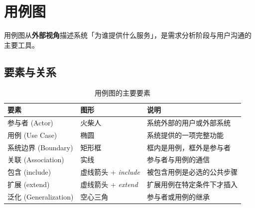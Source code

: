 \section{用例图}

用例图从\textbf{外部视角}描述系统「为谁提供什么服务」，是需求分析阶段与用户沟通的主要工具。

\subsection{要素与关系}

\begin{table}[H]
\centering
\caption{用例图的主要要素}
\begin{tabulary}{\textwidth}{LLL}
\toprule
要素 & 图形 & 说明 \\
\midrule
参与者 (Actor) & 火柴人 & 系统外部的用户或外部系统 \\
用例 (Use Case) & 椭圆 & 系统提供的一项完整功能 \\
系统边界 (Boundary) & 矩形框 & 框内是用例，框外是参与者 \\
关联 (Association) & 实线 & 参与者与用例的通信 \\
包含 (include) & 虚线箭头 + \textit{include} & 被包含用例是必选的公共步骤 \\
扩展 (extend) & 虚线箭头 + \textit{extend} & 扩展用例在特定条件下才插入 \\
泛化 (Generalization) & 空心三角 & 参与者或用例的继承 \\
\bottomrule
\end{tabulary}
\end{table}

\newcommand{\umlactor}[2]{%
    \coordinate (#1) at #2;
    \draw[thick] (#1) ++(0,0.34) circle (0.11);
    \draw[thick] (#1) ++(0,0.23) -- ++(0,-0.35);
    \draw[thick] (#1) ++(-0.16,0.06) -- ++(0.32,0);
    \draw[thick] (#1) ++(0,-0.12) -- ++(-0.14,-0.30);
    \draw[thick] (#1) ++(0,-0.12) -- ++(0.14,-0.30);
}


